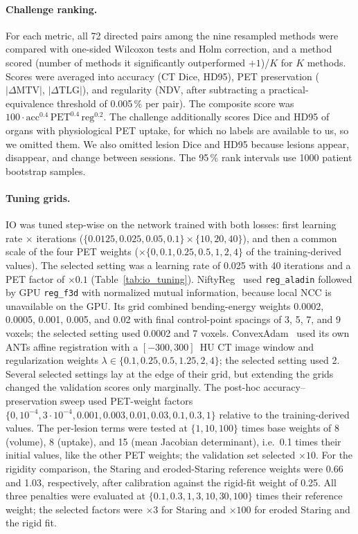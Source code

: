 \paragraph{Challenge ranking.}
For each metric, all 72 directed pairs among the nine resampled methods were compared with one-sided Wilcoxon tests and Holm correction, and a method scored (number of methods it significantly outperformed $+1$)/$K$ for $K$ methods.
Scores were averaged into accuracy (CT Dice, HD95), PET preservation ($|\Delta\mathrm{MTV}|$, $|\Delta\mathrm{TLG}|$), and regularity (NDV, after subtracting a practical-equivalence threshold of 0.005\,\% per pair).
The composite score was $100\cdot\mathrm{acc}^{0.4}\,\mathrm{PET}^{0.4}\,\mathrm{reg}^{0.2}$.
The challenge additionally scores Dice and HD95 of organs with physiological PET uptake, for which no labels are available to us, so we omitted them.
We also omitted lesion Dice and HD95 because lesions appear, disappear, and change between sessions.
The 95\,\% rank intervals use 1000 patient bootstrap samples.

\paragraph{Tuning grids.}
IO was tuned step-wise on the network trained with both losses: first learning rate $\times$ iterations ($\{0.0125,0.025,0.05,0.1\}\times\{10,20,40\}$), and then a common scale of the four PET weights ($\times\{0,0.1,0.25,0.5,1,2,4\}$ of the training-derived values).
The selected setting was a learning rate of 0.025 with 40 iterations and a PET factor of $\times0.1$ (Table~\ref{tab:io_tuning}).
NiftyReg~\cite{MODAT2010,modat2014} used \texttt{reg\_aladin} followed by GPU \texttt{reg\_f3d} with normalized mutual information, because local NCC is unavailable on the GPU.
Its grid combined bending-energy weights 0.0002, 0.0005, 0.001, 0.005, and 0.02 with final control-point spacings of 3, 5, 7, and 9 voxels; the selected setting used 0.0002 and 7 voxels.
ConvexAdam~\cite{ref_convexadam} used its own ANTs affine registration with a $[-300,300]$~HU CT image window and regularization weights $\lambda\in\{0.1,0.25,0.5,1.25,2,4\}$; the selected setting used 2.
Several selected settings lay at the edge of their grid, but extending the grids changed the validation scores only marginally.
The post-hoc accuracy--preservation sweep used PET-weight factors $\{0,10^{-4},3\cdot10^{-4},0.001,0.003,0.01,0.03,0.1,0.3,1\}$ relative to the training-derived values.
The per-lesion terms were tested at $\{1,10,100\}$ times base weights of 8 (volume), 8 (uptake), and 15 (mean Jacobian determinant), i.e.\ 0.1 times their initial values, like the other PET weights; the validation set selected $\times10$.
For the rigidity comparison, the Staring and eroded-Staring reference weights were 0.66 and 1.03, respectively, after calibration against the rigid-fit weight of 0.25.
All three penalties were evaluated at $\{0.1,0.3,1,3,10,30,100\}$ times their reference weight; the selected factors were $\times3$ for Staring and $\times100$ for eroded Staring and the rigid fit.
